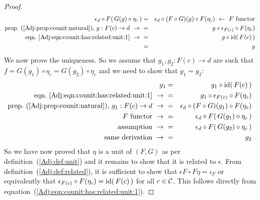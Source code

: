 \begin{proof}
        \begin{eqnarray*}\epsilon_{d}\circ F(\,G(g)\circ\eta_{c}\,)
            &=&\epsilon_{d}\circ (F\circ G)(g)\circ F(\eta_{c})
            \ \leftarrow\ \mbox{$F$ functor}\\
            \mbox{prop.~(\ref{Adj:prop:counit:natural}), $g:F(c)\to d$}\ \to\ 
            &=&g\circ\epsilon_{F(c)}\circ F(\eta_{c})\\
            \mbox{eqn.~\ref{Adj:eqn:counit:has:related:unit:1}}\ \to\ 
            &=&g\circ\id(\,F(c)\,)\\
            &=&g
        \end{eqnarray*}
    We now prove the uniqueness. So we assume that $g_{1},g_{2}:F(c)\to d$ are
    such that $f=G(g_{1})\circ\eta_{c}=G(g_{2})\circ\eta_{c}$ and
    we need to show that $g_{1}=g_{2}$:
        \begin{eqnarray*}g_{1}
            &=&g_{1}\circ\id(\,F(c)\,)\\
            \mbox{eqn.~\ref{Adj:eqn:counit:has:related:unit:1}}\ \to\ 
            &=&g_{1}\circ\epsilon_{F(c)}\circ F(\eta_{c})\\
            \mbox{prop.~(\ref{Adj:prop:counit:natural}), $g_{1}:F(c)\to d$}\ \to\ 
            &=&\epsilon_{d}\circ (F\circ G)(g_{1})\circ F(\eta_{c})\\
            \mbox{$F$ functor}\ \to\ 
            &=&\epsilon_{d}\circ F(\,G(g_{1})\circ\eta_{c}\,)\\
            \mbox{assumption}\ \to\ 
            &=&\epsilon_{d}\circ F(\,G(g_{2})\circ\eta_{c}\,)\\
            \mbox{same derivation}\ \to\ 
            &=&g_{2}
        \end{eqnarray*}
    So we have now proved that $\eta$ is a unit of $(F,G)$ as per
    definition~(\ref{Adj:def:unit}) and it remains to show that it is
    related to $\epsilon$. From definition~(\ref{Adj:def:related}), 
    it is sufficient to show that $\epsilon F\circ F\eta=\iota_{F}$ or
    equivalently that $\epsilon_{F(c)}\circ F(\eta_{c})=\mbox{\rm id}(\,F(c)\,)$ for
    all $c\in\mbox{$\cal C$}$. This follows directly from 
    equation~(\ref{Adj:eqn:counit:has:related:unit:1}).
\end{proof}


